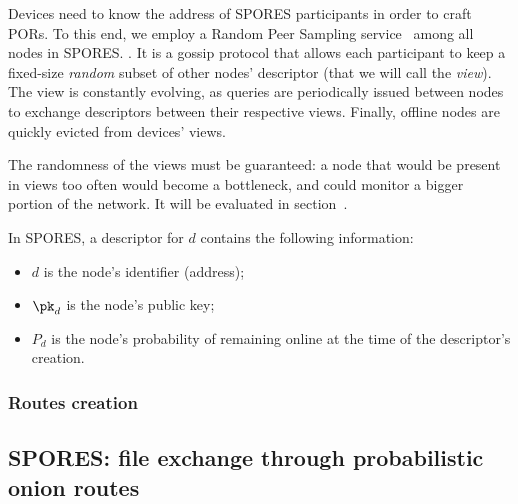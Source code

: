 Devices need to know the address of SPORES participants in order to craft PORs.
To this end, we employ a Random Peer Sampling service~\cite{Jelasity_Voulgaris_Guerraoui_Kermarrec_van_Steen_2007} among all nodes in SPORES. .
It is a gossip protocol that allows each participant to keep a fixed-size \emph{random} subset of other nodes' descriptor (that we will call the \emph{view}). 
The view is constantly evolving, as queries are periodically issued between nodes to exchange descriptors between their respective views.
Finally, offline nodes are quickly evicted from devices' views.

The randomness of the views must be guaranteed: 
a node that would be present in views too often would become a bottleneck, and could monitor a bigger portion of the network.
It will be evaluated in section~.

In SPORES, a descriptor for $d$ contains the following information:
\begin{itemize}
  \item \(d\) is the node's identifier (address);
  \item \(\pk_d\) is the node's public key;
  \item \(P_d\) is the node's probability of remaining online at the time of the descriptor's creation.
\end{itemize}


\subsubsection{Routes creation}
\label{sssec:routes_creation}



\subsection{SPORES: file exchange through probabilistic onion routes}
\label{ssec:spores_file_exchange_through_probabilistic_onion_routes}